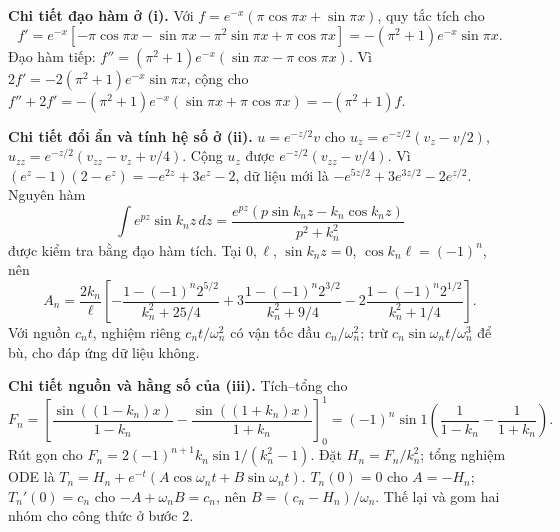 \documentclass[10pt,a4paper]{article}
\begin{document}
\textbf{Chi tiết đạo hàm ở (i).} Với $f=e^{-x}(\pi\cos\pi x+\sin\pi x)$, quy tắc tích cho
\[f'=e^{-x}[-\pi\cos\pi x-\sin\pi x-\pi^2\sin\pi x+\pi\cos\pi x]
=-(\pi^2+1)e^{-x}\sin\pi x.\]
Đạo hàm tiếp: $f''=(\pi^2+1)e^{-x}(\sin\pi x-\pi\cos\pi x)$. Vì $2f'=-2(\pi^2+1)e^{-x}\sin\pi x$, cộng cho $f''+2f'=-(\pi^2+1)e^{-x}(\sin\pi x+\pi\cos\pi x)=-(\pi^2+1)f$.

\textbf{Chi tiết đổi ẩn và tính hệ số ở (ii).} $u=e^{-z/2}v$ cho $u_z=e^{-z/2}(v_z-v/2)$, $u_{zz}=e^{-z/2}(v_{zz}-v_z+v/4)$. Cộng $u_z$ được $e^{-z/2}(v_{zz}-v/4)$. Vì $(e^z-1)(2-e^z)=-e^{2z}+3e^z-2$, dữ liệu mới là $-e^{5z/2}+3e^{3z/2}-2e^{z/2}$. Nguyên hàm
\[\int e^{pz}\sin k_nz\,dz=
\frac{e^{pz}(p\sin k_nz-k_n\cos k_nz)}{p^2+k_n^2}\]
được kiểm tra bằng đạo hàm tích. Tại $0,\ell$, $\sin k_nz=0$, $\cos k_n\ell=(-1)^n$, nên
\[A_n=\frac{2k_n}{\ell}\left[
-\frac{1-(-1)^n2^{5/2}}{k_n^2+25/4}
+3\frac{1-(-1)^n2^{3/2}}{k_n^2+9/4}
-2\frac{1-(-1)^n2^{1/2}}{k_n^2+1/4}\right].\]
Với nguồn $c_nt$, nghiệm riêng $c_nt/\omega_n^2$ có vận tốc đầu $c_n/\omega_n^2$; trừ $c_n\sin\omega_nt/\omega_n^3$ để bù, cho đáp ứng dữ liệu không.

\textbf{Chi tiết nguồn và hằng số của (iii).} Tích–tổng cho
\[F_n=\left[\frac{\sin((1-k_n)x)}{1-k_n}
-\frac{\sin((1+k_n)x)}{1+k_n}\right]_0^1
=(-1)^n\sin1\left(\frac1{1-k_n}-\frac1{1+k_n}\right).\]
Rút gọn cho $F_n=2(-1)^{n+1}k_n\sin1/(k_n^2-1)$. Đặt $H_n=F_n/k_n^2$; tổng nghiệm ODE là $T_n=H_n+e^{-t}(A\cos\omega_nt+B\sin\omega_nt)$. $T_n(0)=0$ cho $A=-H_n$; $T_n'(0)=c_n$ cho $-A+\omega_nB=c_n$, nên $B=(c_n-H_n)/\omega_n$. Thế lại và gom hai nhóm cho công thức ở bước 2.
\end{document}

